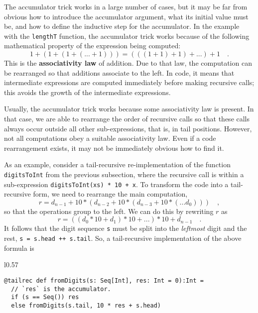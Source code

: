 The accumulator trick works in a large number of cases, but it may
be far from obvious how to introduce the accumulator argument, what
its initial value must be, and how to define the inductive step for
the accumulator. In the example with the \lstinline!lengthT! function,
the accumulator trick works because of the following mathematical
property of the expression being computed:
\[
1+\left(1+\left(1+\left(...+1\right)\right)\right)=\left(\left(\left(1+1\right)+1\right)+...\right)+1\quad.
\]
This is the \textbf{associativity
law} of addition. Due to that law, the computation can be rearranged
so that additions associate to the left. In code, it means that intermediate
expressions are computed immediately before making recursive calls;
this avoids the growth of the intermediate expressions. 

Usually, the accumulator trick works because some associativity law
is present. In that case, we are able to rearrange the order of recursive
calls so that these calls always occur outside all other sub-expressions,
\textemdash{} that is, in tail positions. However, not all computations
obey a suitable associativity law. Even if a code rearrangement exists,
it may not be immediately obvious how to find it.

As an example, consider a tail-recursive re-implementation of the
function \lstinline!digitsToInt! from the previous subsection, where
the recursive call is within a sub-expression \lstinline!digitsToInt(xs) * 10 + x!.
To transform the code into a tail-recursive form, we need to rearrange
the main computation,
\[
r=d_{n-1}+10*\left(d_{n-2}+10*\left(d_{n-3}+10*\left(...d_{0}\right)\right)\right)\quad,
\]
so that the operations group to the left. We can do this by rewriting
$r$ as
\[
r=\left(\left(d_{0}*10+d_{1}\right)*10+...\right)*10+d_{n-1}\quad.
\]
It follows that the digit sequence \lstinline!s! must be split into
the \emph{leftmost} digit and the rest, \lstinline!s = s.head ++ s.tail!.
So, a tail-recursive implementation of the above formula is

\begin{wrapfigure}{l}{0.57\columnwidth}%
\vspace{-0.95\baselineskip}
\begin{lstlisting}
@tailrec def fromDigits(s: Seq[Int], res: Int = 0):Int =
  // `res` is the accumulator.
  if (s == Seq()) res
  else fromDigits(s.tail, 10 * res + s.head)
\end{lstlisting}

\vspace{-1.5\baselineskip}
\end{wrapfigure}%

